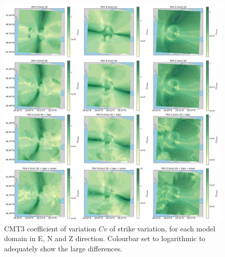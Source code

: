 \documentclass[../Text/00main.tex]{subfiles}
\begin{document}
\begin{figure}[!h]
    \centering
    \includegraphics[width=1\linewidth]{images_results/strike_variation_sigma_sc4.png}
    \caption{CMT3 coefficient of variation $Cv$ of strike variation, for each model domain in E, N and Z direction. Colourbar set to logarithmic to adequately show the large differences.}
    \label{fig:cmt3sigm}
\end{figure}

\FloatBarrier
\end{document}
